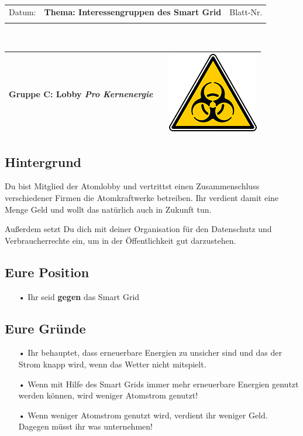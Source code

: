 \documentclass[11pt,a4paper,DIV=10,parskip=half,BCOR=0mm]{scrartcl}
\begin{document}
%
\setlength{\tabcolsep}{3mm} %
\noindent
\begin{tabularx}{\textwidth}{|l|T|l|}
\hline
Datum: & \rule{0pt}{5mm} \textbf{\textsf{Thema: Interessengruppen des Smart Grid}} & Blatt-Nr. \\
&&\\ 
\hline
\end{tabularx}
\rule{0pt}{3mm} \\
\setlength{\tabcolsep}{0mm} %
\begin{tabularx}{\linewidth}{lXr}
{\Large\textsf{\textbf{Gruppe C:} Lobby \textit{Pro Kernenergie}}} & & \includegraphics[scale=0.3]{images/hazard}\\
\hline
\end{tabularx}
%
\subsection*{Hintergrund}
Du bist Mitglied der Atomlobby  und vertrittst einen Zusammenschluss
verschiedener Firmen die Atomkraftwerke betreiben. Ihr verdient damit
eine Menge Geld und wollt das natürlich auch in Zukunft tun.

Außerdem setzt Du dich mit deiner Organisation für den Datenschutz und
Verbraucherrechte ein, um in der Öffentlichkeit gut darzustehen.
\subsection*{Eure Position}
\begin{enumerate}
	\item[•]Ihr seid \textbf{gegen} das Smart Grid
\end{enumerate}
\subsection*{Eure Gründe}
\begin{enumerate}
	\item[•]Ihr behauptet, dass erneuerbare Energien zu unsicher sind und das der Strom knapp wird, wenn das Wetter nicht mitspielt.
	\item[•]Wenn mit Hilfe des Smart Grids immer mehr erneuerbare Energien
genutzt werden können, wird weniger Atomstrom genutzt!
	\item[•] Wenn weniger Atomstrom genutzt wird, verdient ihr weniger Geld.
Dagegen müsst ihr was unternehmen!
\end{enumerate}
\end{document}
